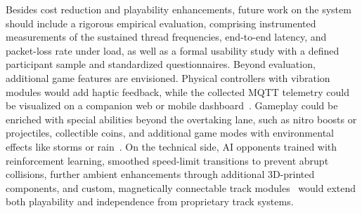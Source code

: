 \documentclass[10pt,journal,final,a4paper]{IEEEtran}
\begin{document}
Besides cost reduction and playability enhancements, future work on the system should include a rigorous empirical evaluation, comprising instrumented measurements of the sustained thread frequencies, end-to-end latency, and packet-loss rate under load, as well as a formal usability study with a defined participant sample and standardized questionnaires. 
Beyond evaluation, additional game features are envisioned. 
Physical controllers with vibration modules would add haptic feedback, while the collected MQTT telemetry could be visualized on a companion web or mobile dashboard~\cite{voelkl:2026sensiq,voelkl:2026bitebound}. 
Gameplay could be enriched with special abilities beyond the overtaking lane, such as nitro boosts or projectiles, collectible coins, and additional game modes with environmental effects like storms or rain~\cite{scalextric:2026arc}. On the technical side, AI opponents trained with reinforcement learning, smoothed speed-limit transitions to prevent abrupt collisions, further ambient enhancements through additional 3D-printed components, and custom, magnetically connectable track modules~\cite{anki:2026overdrive} would extend both playability and independence from proprietary track systems.

\balance 


\end{document}
